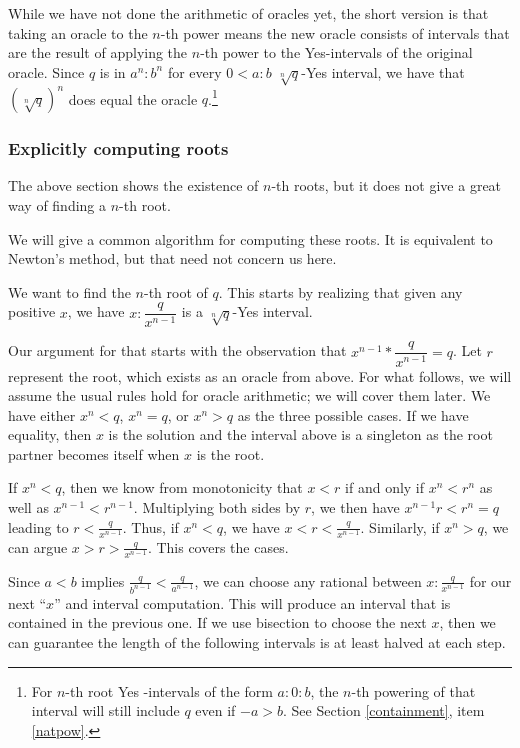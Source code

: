 \documentclass[12pt]{article}
\theoremstyle{remark}
\begin{document}
While we have not done the arithmetic of oracles yet, the short version is that taking an oracle to the $n$-th power means the new oracle consists of intervals that are the result of applying the $n$-th power to the Yes-intervals of the original oracle. Since $q$ is in $a^n:b^n$ for every $0<a:b$ $\sqrt[n]{q}$-Yes interval, we have that $(\sqrt[n]{q})^n$ does equal the oracle $q$.\footnote{For $n$-th root Yes -intervals of the form $a:0:b$, the $n$-th powering of that interval will still include $q$ even if $-a>b$. See Section \ref{containment}, item \ref{natpow}.} 

\subsubsection{Explicitly computing roots}

The above section shows the existence of $n$-th roots, but it does not give a great way of finding a $n$-th root. 

We will give a common algorithm for computing these roots. It is equivalent to Newton's method, but that need not concern us here. 

We want to find the $n$-th root of $q$. This starts by realizing that given any positive $x$, we have $x:\dfrac{q}{x^{n-1}}$ is a $\sqrt[n]{q}$-Yes interval. 

Our argument for that starts with the observation that $x^{n-1}*\dfrac{q}{x^{n-1}} = q$. Let $r$ represent the root, which exists as an oracle from above. For what follows, we will assume the usual rules hold for oracle arithmetic; we will cover them later. We have either $x^n < q$, $x^n = q$, or $x^n > q$ as the three possible cases. If we have equality, then $x$ is the solution and the interval above is a singleton as the root partner becomes itself when $x$ is the root. 

If $x^n < q$, then we know from monotonicity that $x < r$ if and only if $x^n < r^n$ as well as $x^{n-1} < r^{n-1}$. Multiplying both sides by $r$, we then have $x^{n-1} r < r^{n} = q$ leading to $r < \frac{q}{x^{n-1}}$. Thus, if $x^n < q$, we have $x<r<\frac{q}{x^{n-1}}$. Similarly, if $x^n > q$, we can argue $x > r > \frac{q}{x^{n-1}}$. This covers the cases. 

Since $a<b$ implies $\frac{q}{b^{n-1}} < \frac{q}{a^{n-1}}$, we can choose any rational between $x:\frac{q}{x^{n-1}}$ for our next ``$x$'' and interval computation. This will produce an interval that is contained in the previous one. If we use bisection to choose the next $x$, then we can guarantee the length of the following intervals is at least halved at each step. 
\end{document}
